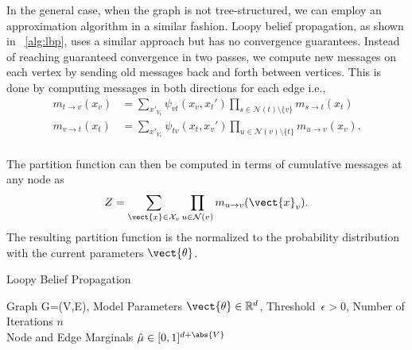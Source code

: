 

In the general case, when the graph is not tree-structured, we can employ an approximation algorithm in a similar fashion. 
Loopy belief propagation, as shown in \alg~\ref{alg:lbp}, uses a similar approach but has no convergence guarantees.
Instead of reaching guaranteed convergence in two passes, we compute new messages on each vertex by sending old messages back and forth between vertices.
This is done by computing messages in both directions for each edge i.e., 
\begin{equation}
    \begin{split}
        \label{eq:mespas}
        m_{t \rightarrow v}(x_v) &= \sum_{x'_{V_t}} \psi_{vt}(x_v, x_t') \prod_{s\in \mathcal{N}(t) \setminus \{v\}} m_{s \rightarrow t}(x_t) \\
        m_{v \rightarrow t}(x_t) &= \sum_{x'_{V_v}} \psi_{tv}(x_t, x_v') \prod_{u\in \mathcal{N}(v) \setminus \{t\}} m_{u \rightarrow v}(x_v). \\
    \end{split}
\end{equation}

The partition function can then be computed in terms of cumulative messages\cite{piatkowski2018exponential} at any node as 
\begin{equation}
    Z = \sum_{\vect{x} \in \mathcal{X}_v} \prod_{u \in \mathcal{N}(v)} m_{u \rightarrow v}(\vect{x}_v).
\end{equation} 
The resulting partition function is the normalized to the probability distribution with the current parameters $\vect{\theta}$.

\begin{algo}{Loopy Belief Propagation}
    \begin{algorithm}[H]
        \caption{Loopy Belief Propagation}
        \begin{algorithmic}
            \label{alg:lbp}
            \REQUIRE Graph G=(V,E), Model Parameters $\vect{\theta} \in \mathbb{R}^d$, Threshold~$\epsilon > 0$, Number of Iterations $n$\\
            \ENSURE  Node and Edge Marginals $\hat{\mu} \in [0,1]^{d + \abs{V}}$ \\
                \\
                \ENDFOR
                \\
                \\
                \ENDIF
            \ENDFOR
        \end{algorithmic}
    \end{algorithm}
\end{algo}
